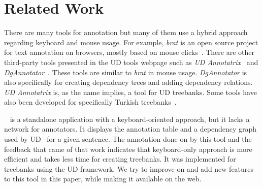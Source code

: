 \section{Related Work}
\label{sec:related}

There are many tools for annotation but many of them use a hybrid approach regarding keyboard and mouse usage.
For example, \textit{brat} is an open source project for text annotation on browsers, mostly based on mouse clicks~\cite{brat,UD}.
There are other third-party tools presented in the UD tools webpage such as \textit{UD Annotatrix}~\cite{tyers-etal:2018} and \textit{DgAnnotator}~\cite{dgannotator}.
These tools are similar to \textit{brat} in mouse usage.
\textit{DgAnnotator} is also specifically for creating dependency trees and adding dependency relations.
\textit{UD Annotatrix} is, as the name implies, a tool for UD treebanks.
Some tools have also been developed for specifically Turkish treebanks~\cite{turk-etal-2019-turkish}.

\boatvone~\cite{turk-etal-2019-turkish} is a standalone application with a keyboard-oriented approach, but it lacks a network for annotators.
It displays the annotation table and a dependency graph used by UD~\cite{UD} for a given sentence.
The annotation done on \bountreebank{} by this tool and the feedback that came of that work indicates that keyboard-only approach is more efficient and takes less time for creating treebanks.
It was implemented for treebanks using the UD framework.
We try to improve on and add new features to this tool in this paper, while making it available on the web.
